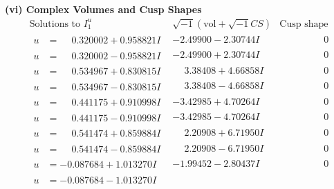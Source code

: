 \documentclass[1p]{elsarticle_modified}
\theoremstyle{definition}
\newcommand{\I}{\sqrt{-1}}
\begin{document}
\newpage\flushleft \textbf{(vi) Complex Volumes and Cusp Shapes}
$$\begin{array}{c|c|c}  
\text{Solutions to }I^u_{1}& \I (\text{vol} + \sqrt{-1}CS) & \text{Cusp shape}\\
 \hline 
\begin{aligned}
u &= \phantom{-}0.320002 + 0.958821 I\end{aligned}
 & -2.49900 - 2.30744 I & \phantom{-0.000000 } 0 \\ \hline\begin{aligned}
u &= \phantom{-}0.320002 - 0.958821 I\end{aligned}
 & -2.49900 + 2.30744 I & \phantom{-0.000000 } 0 \\ \hline\begin{aligned}
u &= \phantom{-}0.534967 + 0.830815 I\end{aligned}
 & \phantom{-}3.38408 + 4.66858 I & \phantom{-0.000000 } 0 \\ \hline\begin{aligned}
u &= \phantom{-}0.534967 - 0.830815 I\end{aligned}
 & \phantom{-}3.38408 - 4.66858 I & \phantom{-0.000000 } 0 \\ \hline\begin{aligned}
u &= \phantom{-}0.441175 + 0.910998 I\end{aligned}
 & -3.42985 + 4.70264 I & \phantom{-0.000000 } 0 \\ \hline\begin{aligned}
u &= \phantom{-}0.441175 - 0.910998 I\end{aligned}
 & -3.42985 - 4.70264 I & \phantom{-0.000000 } 0 \\ \hline\begin{aligned}
u &= \phantom{-}0.541474 + 0.859884 I\end{aligned}
 & \phantom{-}2.20908 + 6.71950 I & \phantom{-0.000000 } 0 \\ \hline\begin{aligned}
u &= \phantom{-}0.541474 - 0.859884 I\end{aligned}
 & \phantom{-}2.20908 - 6.71950 I & \phantom{-0.000000 } 0 \\ \hline\begin{aligned}
u &= -0.087684 + 1.013270 I\end{aligned}
 & -1.99452 - 2.80437 I & \phantom{-0.000000 } 0 \\ \hline\begin{aligned}
u &= -0.087684 - 1.013270 I\end{aligned}

\end{array}$$
\end{document}
